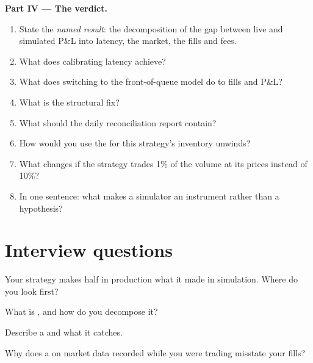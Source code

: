 \begin{problem}
\medskip\noindent\textbf{Part IV --- The verdict.}
\begin{enumerate}[resume]
\item State the \emph{named result}: the decomposition of the gap between live and simulated P\&L into latency, the market, the fills and fees.
\item What does calibrating latency achieve?
\item What does switching to the front-of-queue model do to fills and P\&L?
\item What is the structural fix?
\item What should the daily reconciliation report contain?
\item How would you use the  for this strategy's inventory unwinds?
\item What changes if the strategy trades 1\% of the volume at its prices instead of 10\%?
\item In one sentence: what makes a simulator an instrument rather than a hypothesis?
\end{enumerate}
\end{problem}

\section{Interview questions}

\begin{interviewq}\label{iq:rs:simulation-versus-live:1}
Your strategy makes half in production what it made in simulation. Where do you look first?
\end{interviewq}

\begin{interviewq}\label{iq:rs:simulation-versus-live:2}
What is , and how do you decompose it?
\end{interviewq}

\begin{interviewq}\label{iq:rs:simulation-versus-live:3}
Describe a  and what it catches.
\end{interviewq}

\begin{interviewq}\label{iq:rs:simulation-versus-live:4}
Why does a  on market data recorded while you were trading misstate your fills?
\end{interviewq}

